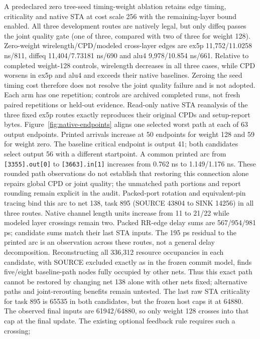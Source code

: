 \documentclass[10pt]{article}
\begin{document}
A predeclared zero tree-seed timing-weight ablation retains edge timing,
criticality and native STA at cost scale 256 with the remaining-layer
bound enabled. All three development routes are natively legal, but
only diffeq passes the joint quality gate (one of three, compared with
two of three for weight 128). Zero-weight wirelength/CPD/modeled
cross-layer edges are ex5p 11,752/11.0258 ns/811, diffeq
11,404/7.73181 ns/690 and alu4 9,978/10.854 ns/661.
Relative to completed weight-128 controls, wirelength decreases in all
three cases, while CPD worsens in ex5p and alu4 and exceeds their native
baselines. Zeroing the seed timing cost therefore does not resolve the
joint quality failure and is not adopted. Each arm has one repetition;
controls are archived completed runs, not fresh paired repetitions or
held-out evidence.
Read-only native STA reanalysis of the three fixed ex5p routes exactly
reproduces their original CPDs and setup-report bytes. Figure~\ref{fig:native-endpoints}
aligns one selected worst path at each of 63 output endpoints. Printed
arrivals increase at 50 endpoints for weight 128 and 59 for weight zero.
The baseline critical endpoint is output 41; both candidates select
output 56 with a different startpoint. A common printed arc from
\texttt{[3355].out[0]} to \texttt{[3663].in[1]} increases from
0.762 ns to 1.149/1.176 ns. These rounded path observations do not
establish that restoring this connection alone repairs global CPD or
joint quality; the unmatched path portions and report rounding remain
explicit in the audit.
Packed-port rotation and equivalent-pin tracing bind this arc to net 138,
task 895 (SOURCE 43804 to SINK 14256) in all three routes. Native channel
length units increase from 11 to 21/22 while modeled layer crossings
remain two. Packed RR-edge delay sums are 567/954/981 ps; candidate sums
match their last STA inputs. The 195 ps residual to the printed arc is
an observation across these routes, not a general delay decomposition.
Reconstructing all 336,312 resource occupancies in each candidate, with
SOURCE excluded exactly as in the frozen commit model, finds five/eight
baseline-path nodes fully occupied by other nets. Thus this exact path
cannot be restored by changing net 138 alone with other nets fixed;
alternative paths and joint-rerouting benefits remain untested.
The last raw STA criticality for task 895 is 65535 in both candidates,
but the frozen host caps it at 64880. The observed final inputs are
61942/64880, so only weight 128 crosses into that cap at the final
update. The existing optional feedback rule requires such a crossing;
\end{document}
